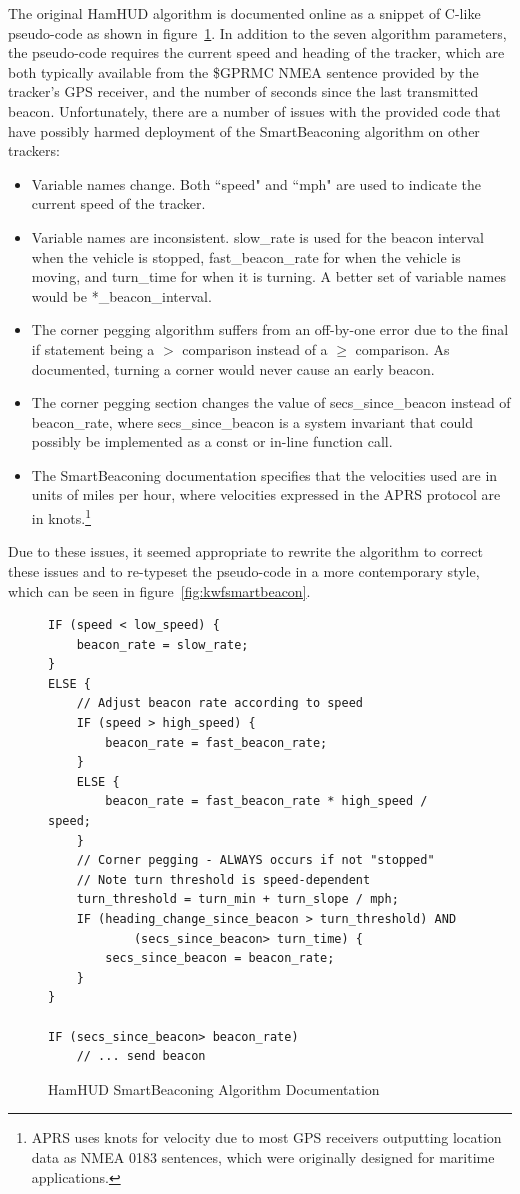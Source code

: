 The original HamHUD algorithm is documented online as a snippet of C-like 
pseudo-code as shown in figure~\ref{fig:hamhudsmartbeacon}.
In addition to the seven algorithm parameters, the pseudo-code
requires the current speed and heading of the tracker, which are both
typically available from the \$GPRMC NMEA sentence \cite{nmearmc} provided by the 
tracker's GPS receiver, and the number of seconds since the last transmitted beacon.
Unfortunately, there are a number of issues with the provided code that
have possibly harmed deployment of the SmartBeaconing algorithm on other trackers:
\begin{itemize}
	\item Variable names change. Both ``speed" and ``mph" are used 
		to indicate the current speed of the tracker.
	\item Variable names are inconsistent. 
		slow\_rate is used for the beacon interval when the vehicle is stopped, 
		fast\_beacon\_rate for when the vehicle is moving,
		and turn\_time for when it is turning.
		A better set of variable names would be *\_beacon\_interval.
	\item The corner pegging algorithm suffers from an off-by-one error due to
		the final if statement being a $>$ comparison instead
		of a $\geq$ comparison. As documented, turning a corner would
		never cause an early beacon.
	\item The corner pegging section changes the value of secs\_since\_beacon
		instead of beacon\_rate, where secs\_since\_beacon is a system
		invariant that could possibly be implemented as a const
		or in-line function call.
	\item The SmartBeaconing documentation specifies that 
		the velocities used are in units
		of miles per hour, where velocities expressed in the APRS
		protocol are in knots.\footnote{APRS uses knots for velocity
			due to most GPS receivers outputting location
			data as NMEA 0183 sentences, which were originally designed 
			for maritime applications.}
\end{itemize}

Due to these issues, it seemed appropriate to rewrite the algorithm 
to correct these issues and to re-typeset the pseudo-code in a more
contemporary style, which can be seen in figure~\ref{fig:kwfsmartbeacon}.

\begin{figure}[p]
\begin{lstlisting}
IF (speed < low_speed) {
	beacon_rate = slow_rate;
}
ELSE {
	// Adjust beacon rate according to speed
	IF (speed > high_speed) {
		beacon_rate = fast_beacon_rate;
	}
	ELSE {
		beacon_rate = fast_beacon_rate * high_speed / speed;
	}
	// Corner pegging - ALWAYS occurs if not "stopped"
	// Note turn threshold is speed-dependent
	turn_threshold = turn_min + turn_slope / mph;
	IF (heading_change_since_beacon > turn_threshold) AND
			(secs_since_beacon> turn_time) {
		secs_since_beacon = beacon_rate;
	}
}

IF (secs_since_beacon> beacon_rate)
	// ... send beacon
\end{lstlisting}
\caption{HamHUD SmartBeaconing Algorithm Documentation}
\label{fig:hamhudsmartbeacon}
\end{figure}

